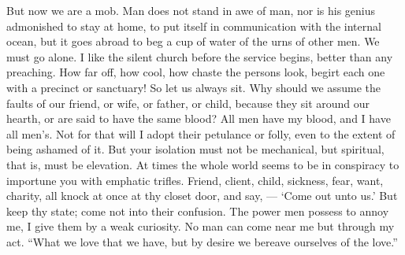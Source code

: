 \documentclass{article}
\begin{document}
But now we are a mob. Man does not stand in awe of man, nor is his genius
admonished to stay at home, to put itself in communication with the internal
ocean, but it goes abroad to beg a cup of water of the urns of other men. We
must go alone. I like the silent church before the service begins, better
than any preaching. How far off, how cool, how chaste the persons look,
begirt each one with a precinct or sanctuary! So let us always sit. Why
should we assume the faults of our friend, or wife, or father, or child,
because they sit around our hearth, or are said to have the same blood? All
men have my blood, and I have all men's. Not for that will I adopt their
petulance or folly, even to the extent of being ashamed of it. But your
isolation must not be mechanical, but spiritual, that is, must be elevation.
At times the whole world seems to be in conspiracy to importune you with
emphatic trifles. Friend, client, child, sickness, fear, want, charity, all
knock at once at thy closet door, and say, --- `Come out unto us.' But keep
thy state; come not into their confusion. The power men possess to annoy me,
I give them by a weak curiosity. No man can come near me but through my act.
``What we love that we have, but by desire we bereave ourselves of the love.''
\end{document}
